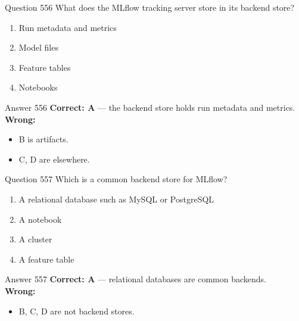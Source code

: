 \documentclass[aspectratio=169,11pt]{beamer}
\begin{document}
	\begin{frame}{Question 556}
		What does the MLflow tracking server store in its backend store?
		\begin{enumerate}[label=\Alph*.]
			\item Run metadata and metrics
			\item Model files
			\item Feature tables
			\item Notebooks
		\end{enumerate}
	\end{frame}
	\begin{frame}{Answer 556}
		\textbf{Correct: A} --- the backend store holds run metadata and metrics.\\
		\vspace{0.5em}
		\textbf{Wrong:}
		\begin{itemize}
			\item B is artifacts.
			\item C, D are elsewhere.
		\end{itemize}
	\end{frame}
	
	\begin{frame}{Question 557}
		Which is a common backend store for MLflow?
		\begin{enumerate}[label=\Alph*.]
			\item A relational database such as MySQL or PostgreSQL
			\item A notebook
			\item A cluster
			\item A feature table
		\end{enumerate}
	\end{frame}
	\begin{frame}{Answer 557}
		\textbf{Correct: A} --- relational databases are common backends.\\
		\vspace{0.5em}
		\textbf{Wrong:}
		\begin{itemize}
			\item B, C, D are not backend stores.
		\end{itemize}
	\end{frame}
	
\end{document}
